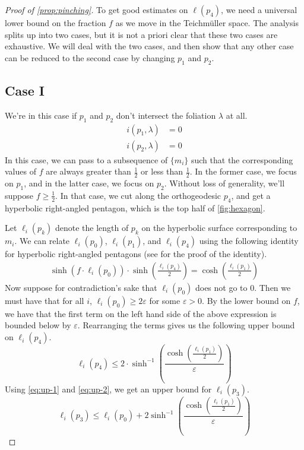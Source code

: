 \begin{proof}[Proof of \autoref{prop:pinching}]
 To get good estimates on $\ell(p_4)$, we need a universal lower bound on the fraction $f$ as we move in the Teichm\"uller space.
 The analysis splits up into two cases, but it is not {a priori} clear that these two cases are exhaustive.
 We will deal with the two cases, and then show that any other case can be reduced to the second case by changing $p_1$ and $p_2$.

\subsection*{Case I}
\label{case1}
We're in this case if $p_1$ and $p_2$ don't intersect the foliation $\lambda$ at all.
\begin{align*}
  i(p_1, \lambda) &= 0 \\
  i(p_2, \lambda) &= 0
\end{align*}
In this case, we can pass to a subsequence of $\{m_i\}$ such that the corresponding values of $f$ are always greater than $\frac{1}{2}$ or less than $\frac{1}{2}$.
In the former case, we focus on $p_1$, and in the latter case, we focus on $p_2$.
Without loss of generality, we'll suppose $f \geq \frac{1}{2}$.
In that case, we cut along the orthogeodesic $p_4$, and get a hyperbolic right-angled pentagon, which is the top half of \autoref{fig:hexagon}.

Let $\ell_i(p_k)$ denote the length of $p_k$ on the hyperbolic surface corresponding to $m_i$.
We can relate $\ell_i(p_0)$, $\ell_i(p_1)$, and $\ell_i(p_4)$ using the following identity for hyperbolic right-angled pentagons (see \cite{thurston1979geometry} for the proof of the identity).
\begin{align}
  \label{eq:pentagon}
  \sinh\left( f \cdot \ell_i(p_0) \right)  \cdot \sinh\left( \frac{\ell_i(p_4)}{2} \right)  = \cosh\left( \frac{\ell_i(p_1)}{2} \right)
\end{align}
Now suppose for contradiction's sake that $\ell_i(p_0)$ does not go to $0$.
Then we must have that for all $i$, $\ell_i(p_0) \geq 2\varepsilon$ for some $\varepsilon > 0$. By the lower bound on $f$, we have that the first term on the left hand side of the above expression is bounded below by $\varepsilon$.
Rearranging the terms gives us the following upper bound on $\ell_i(p_4)$.
\begin{equation}
  \label{eq:up-2}
  \ell_i(p_4) \leq 2 \cdot \sinh^{-1} \left( \frac{\cosh \left( \frac{\ell_i(p_1)}{2} \right)}{\varepsilon} \right)
\end{equation}
Using \eqref{eq:up-1} and \eqref{eq:up-2}, we get an upper bound for $\ell_i(p_3)$.
\begin{equation}
  \label{eq:up-3}
  \ell_i(p_3) \leq \ell_i(p_0) +
  2 \sinh^{-1} \left( \frac{\cosh \left( \frac{\ell_i(p_1)}{2} \right)}{\varepsilon} \right)
\end{equation}


\end{proof}
